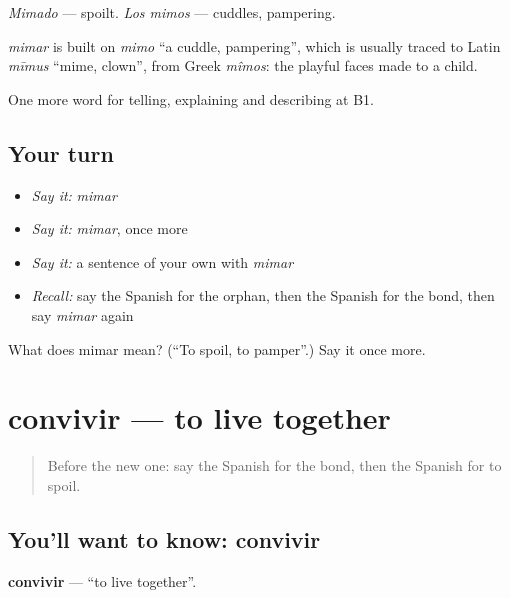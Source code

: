\emph{Mimado} — spoilt. \emph{Los mimos} — cuddles, pampering.

\begin{cousinweb}
\emph{mimar} is built on \emph{mimo} \textquotedblleft{}a cuddle, pampering\textquotedblright{}, which is usually traced to Latin \emph{mīmus} \textquotedblleft{}mime, clown\textquotedblright{}, from Greek \emph{mîmos}: the playful faces made to a child.
\end{cousinweb}

\begin{grammarlens}[title={What you've built}]
One more word for telling, explaining and describing at B1.
\end{grammarlens}

\subsection*{Your turn}
\begin{itemize}
\raggedright
  \item \emph{Say it:} \emph{mimar}
  \item \emph{Say it:} \emph{mimar}, once more
  \item \emph{Say it:} a sentence of your own with \emph{mimar}
  \item \emph{Recall:} say the Spanish for the orphan, then the Spanish for the bond, then say \emph{mimar} again
\end{itemize}

\begin{tcolorbox}[breakable,colback=teal!4,colframe=teal!35!black,title={Before you move on}]
What does mimar mean? (\textquotedblleft{}To spoil, to pamper\textquotedblright{}.) Say it once more.
\end{tcolorbox}
\section[convivir]{convivir — to live together}

\label{lesson:ES-C750-convivir}



\begin{quote}
Before the new one: say the Spanish for the bond, then the Spanish for to spoil.
\end{quote}

\subsection*{You'll want to know: convivir}
\textbf{convivir} — \textquotedblleft{}to live together\textquotedblright{}.

